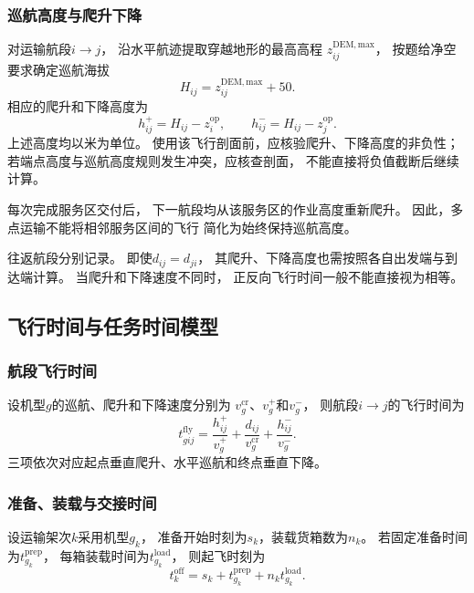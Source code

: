 \documentclass[bwprint]{gmcmthesis}
\begin{document}
\subsubsection{巡航高度与爬升下降}

对运输航段$i\to j$，
沿水平航迹提取穿越地形的最高高程
$z_{ij}^{\mathrm{DEM,max}}$，
按题给净空要求确定巡航海拔
\begin{equation}
    H_{ij}
    =
    z_{ij}^{\mathrm{DEM,max}}+50.
\end{equation}
相应的爬升和下降高度为
\begin{equation}
    h_{ij}^{+}
    =
    H_{ij}-z_i^{\mathrm{op}},
    \qquad
    h_{ij}^{-}
    =
    H_{ij}-z_j^{\mathrm{op}}.
\end{equation}
上述高度均以米为单位。
使用该飞行剖面前，应核验爬升、下降高度的非负性；
若端点高度与巡航高度规则发生冲突，应核查剖面，
不能直接将负值截断后继续计算。

每次完成服务区交付后，
下一航段均从该服务区的作业高度重新爬升。
因此，多点运输不能将相邻服务区间的飞行
简化为始终保持巡航高度。

往返航段分别记录。
即使$d_{ij}=d_{ji}$，
其爬升、下降高度也需按照各自出发端与到达端计算。
当爬升和下降速度不同时，
正反向飞行时间一般不能直接视为相等。
\subsection{飞行时间与任务时间模型}

\subsubsection{航段飞行时间}

设机型$g$的巡航、爬升和下降速度分别为
$v_g^{\mathrm{cr}}$、$v_g^{+}$和$v_g^{-}$，
则航段$i\to j$的飞行时间为
\begin{equation}
    t_{gij}^{\mathrm{fly}}
    =
    \frac{h_{ij}^{+}}{v_g^{+}}
    +
    \frac{d_{ij}}{v_g^{\mathrm{cr}}}
    +
    \frac{h_{ij}^{-}}{v_g^{-}}.
\end{equation}
三项依次对应起点垂直爬升、水平巡航和终点垂直下降。

\subsubsection{准备、装载与交接时间}

设运输架次$k$采用机型$g_k$，
准备开始时刻为$s_k$，装载货箱数为$n_k$。
若固定准备时间为$t_{g_k}^{\mathrm{prep}}$，
每箱装载时间为$t_{g_k}^{\mathrm{load}}$，
则起飞时刻为
\begin{equation}
    t_k^{\mathrm{off}}
    =
    s_k+t_{g_k}^{\mathrm{prep}}
    +n_k t_{g_k}^{\mathrm{load}}.
\end{equation}
\end{document}
